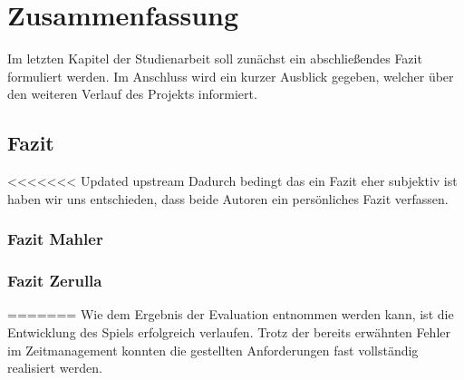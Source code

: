 \section{Zusammenfassung}
Im letzten Kapitel der Studienarbeit soll zunächst ein abschließendes Fazit formuliert werden. Im Anschluss wird ein kurzer Ausblick gegeben, welcher über den weiteren Verlauf des Projekts informiert.

\subsection{Fazit}
<<<<<<< Updated upstream
	Dadurch bedingt das ein Fazit eher subjektiv ist haben wir uns entschieden, dass beide Autoren ein persönliches Fazit verfassen.
	\subsubsection{Fazit Mahler}
	\subsubsection{Fazit Zerulla}
=======
Wie dem Ergebnis der Evaluation entnommen werden kann, ist die Entwicklung des Spiels erfolgreich verlaufen. Trotz der bereits erwähnten Fehler im Zeitmanagement konnten die gestellten Anforderungen fast vollständig realisiert werden. 


